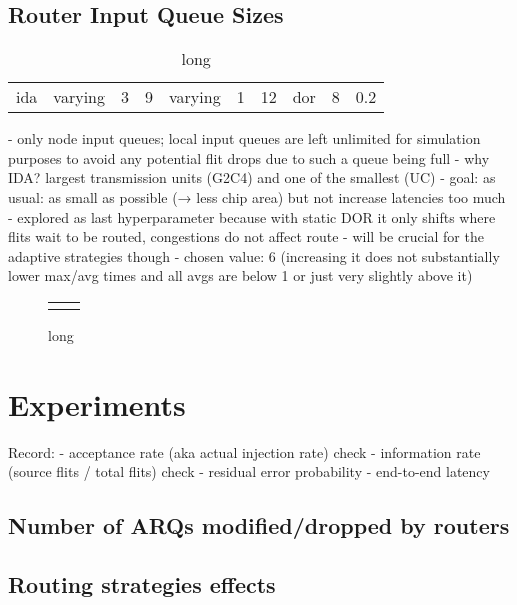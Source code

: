 \subsection{Router Input Queue Sizes}
\begin{table}
    \centering
    \begin{tabulary}{\textwidth}{C|C|C|C|C|C|C|C|C|C}
        \pProtVar{} & \pNCMode{} & \pEncMods{} & \pAuthMods{} & \pRQSize{} & \pARQLimit{} & \pARQTimeout{} & \pRStrat{} & \pNumAttackers{} & \pAttackProb{} \\\hline
        \gls{ida} & varying & 3 & 9 & varying & 1 & 12 & \gls{dor} & 8 & 0.2 \\
    \end{tabulary}
    \caption[Input parameters for router queue sizes experiment]{long}
    \label{tab:setupqueuesizes}
\end{table}
- only node input queues; local input queues are left unlimited for simulation purposes to avoid any potential flit drops due to such a queue being full
- why IDA? largest transmission units (G2C4) and one of the smallest (UC)
- goal: as usual: as small as possible (→ less chip area) but not increase latencies too much
- explored as last hyperparameter because with static DOR it only shifts where flits wait to be routed, congestions do not affect route
  - will be crucial for the adaptive strategies though
- chosen value: 6 (increasing it does not substantially lower max/avg times and all avgs are below 1 or just very slightly above it)

\begin{figure}
    \centering
    \begin{tabular}{ll}
         & 
    \end{tabular}
    \caption[Results for router queue lengths experiment]{long}
    \label{fig:resultsqueuelengths}
\end{figure}
\section{Experiments}
Record:
- acceptance rate (aka actual injection rate) check
- information rate (source flits / total flits) check
- residual error probability
- end-to-end latency
\subsection{Number of ARQs modified/dropped by routers}
\subsection{Routing strategies effects}

